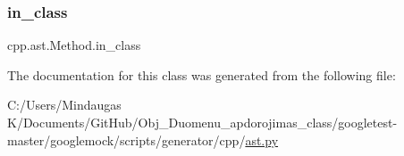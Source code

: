 \subsubsection{\texorpdfstring{in\_class}{in\_class}}
{\footnotesize\ttfamily cpp.\+ast.\+Method.\+in\+\_\+class}



The documentation for this class was generated from the following file\+:\begin{DoxyCompactItemize}
\item 
C\+:/\+Users/\+Mindaugas K/\+Documents/\+Git\+Hub/\+Obj\+\_\+\+Duomenu\+\_\+apdorojimas\+\_\+class/googletest-\/master/googlemock/scripts/generator/cpp/\mbox{\hyperlink{googletest-master_2googlemock_2scripts_2generator_2cpp_2ast_8py}{ast.\+py}}\end{DoxyCompactItemize}
